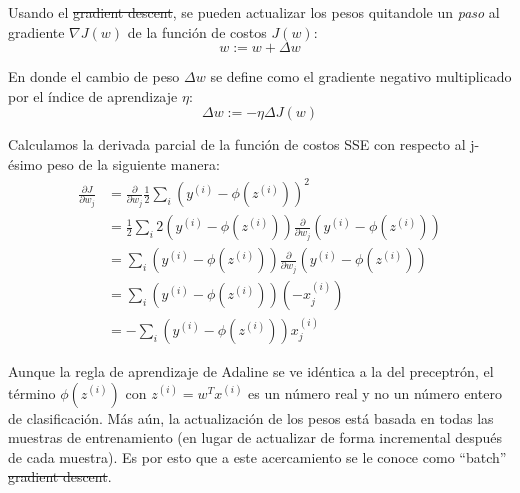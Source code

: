 Usando el \sout{gradient descent}, se pueden actualizar los pesos quitandole un \textit{paso}
al gradiente $\nabla J(w)$ de la función de costos $J(w)$:
\begin{equation}
  w := w + \Delta w
\end{equation}

En donde el cambio de peso $\Delta w$ se define como el gradiente negativo multiplicado
por el índice de aprendizaje $\eta$:
\begin{equation}
  \Delta w := -\eta \Delta J(w)
\end{equation}

Calculamos la derivada parcial de la función de costos SSE con respecto al
j-ésimo peso de la siguiente manera:
\begin{equation*}
\begin{split}
  \frac{\partial J}{\partial w_j} &= \frac{\partial}{\partial w_j}\frac{1}{2}\sum_i (y^{(i)} - \phi(z^{(i)}))^2 \\
  &= \frac{1}{2}\sum_i 2(y^{(i)} - \phi(z^{(i)}))\frac{\partial}{\partial w_j}(y^{(i)} - \phi(z^{(i)}))\\
  &= \sum_i (y^{(i)} - \phi(z^{(i)}))\frac{\partial}{\partial w_j}(y^{(i)} - \phi (z^{(i)}))\\
  &= \sum_i(y^{(i)} - \phi(z^{(i)}))(-x_j^{(i)})\\
  &= -\sum_i(y^{(i)} - \phi(z^{(i)}))x_j^{(i)}
\end{split}
\end{equation*}

Aunque la regla de aprendizaje de Adaline se ve idéntica a la del preceptrón,
el término $\phi(z^{(i)})$ con $z^{(i)}=w^Tx^{(i)}$ es un número real y no un
número entero de clasificación. Más aún, la actualización de los pesos está
basada en todas las muestras de entrenamiento (en lugar de actualizar de
forma incremental después de cada muestra). Es por esto que a este acercamiento
se le conoce como ``batch'' \sout{gradient descent}.

